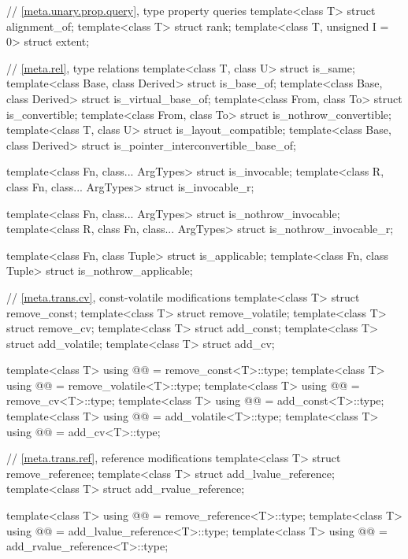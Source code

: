 \begin{codeblock}
{  // \ref{meta.unary.prop.query}, type property queries
  template<class T> struct alignment_of;
  template<class T> struct rank;
  template<class T, unsigned I = 0> struct extent;

  // \ref{meta.rel}, type relations
  template<class T, class U> struct is_same;
  template<class Base, class Derived> struct is_base_of;
  template<class Base, class Derived> struct is_virtual_base_of;
  template<class From, class To> struct is_convertible;
  template<class From, class To> struct is_nothrow_convertible;
  template<class T, class U> struct is_layout_compatible;
  template<class Base, class Derived> struct is_pointer_interconvertible_base_of;

  template<class Fn, class... ArgTypes> struct is_invocable;
  template<class R, class Fn, class... ArgTypes> struct is_invocable_r;

  template<class Fn, class... ArgTypes> struct is_nothrow_invocable;
  template<class R, class Fn, class... ArgTypes> struct is_nothrow_invocable_r;

  template<class Fn, class Tuple> struct is_applicable;
  template<class Fn, class Tuple> struct is_nothrow_applicable;

  // \ref{meta.trans.cv}, const-volatile modifications
  template<class T> struct remove_const;
  template<class T> struct remove_volatile;
  template<class T> struct remove_cv;
  template<class T> struct add_const;
  template<class T> struct add_volatile;
  template<class T> struct add_cv;

  template<class T>
    using @@    = remove_const<T>::type;
  template<class T>
    using @@ = remove_volatile<T>::type;
  template<class T>
    using @@       = remove_cv<T>::type;
  template<class T>
    using @@       = add_const<T>::type;
  template<class T>
    using @@    = add_volatile<T>::type;
  template<class T>
    using @@          = add_cv<T>::type;

  // \ref{meta.trans.ref}, reference modifications
  template<class T> struct remove_reference;
  template<class T> struct add_lvalue_reference;
  template<class T> struct add_rvalue_reference;

  template<class T>
    using @@     = remove_reference<T>::type;
  template<class T>
    using @@ = add_lvalue_reference<T>::type;
  template<class T>
    using @@ = add_rvalue_reference<T>::type;

}
\end{codeblock}
